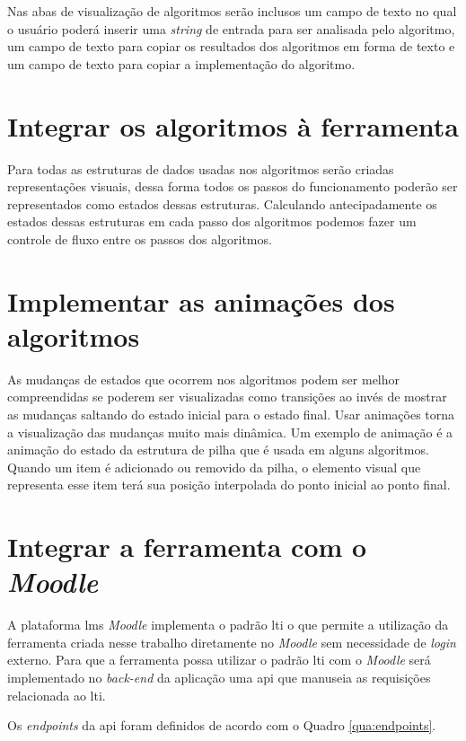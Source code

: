 Nas abas de visualização de algoritmos serão inclusos um campo de texto no qual o usuário poderá inserir uma \textit{string} de entrada para ser analisada pelo algoritmo, um campo de texto para copiar os resultados dos algoritmos em forma de texto e um campo de texto para copiar a implementação do algoritmo.

\section{Integrar os algoritmos à ferramenta}
Para todas as estruturas de dados usadas nos algoritmos serão criadas representações visuais, dessa forma todos os passos do funcionamento poderão ser representados como estados dessas estruturas. Calculando antecipadamente os estados dessas estruturas em cada passo dos algoritmos podemos fazer um controle de fluxo entre os passos dos algoritmos.

\section{Implementar as animações dos algoritmos}
As mudanças de estados que ocorrem nos algoritmos podem ser melhor compreendidas se poderem ser visualizadas como transições ao invés de mostrar as mudanças saltando do estado inicial para o estado final. Usar animações torna a visualização das mudanças muito mais dinâmica. Um exemplo de animação é a animação do estado da estrutura de pilha que é usada em alguns algoritmos. Quando um item é adicionado ou removido da pilha, o elemento visual que representa esse item terá sua posição interpolada do ponto inicial ao ponto final.

\section{Integrar a ferramenta com o \textit{Moodle}}
A plataforma \gls{lms} \textit{Moodle} implementa o padrão \gls{lti} o que permite a utilização da ferramenta criada nesse trabalho diretamente no \textit{Moodle} sem necessidade de \textit{login} externo. Para que a ferramenta possa utilizar o padrão \gls{lti} com o \textit{Moodle} será implementado no \textit{back-end} da aplicação uma \gls{api} que manuseia as requisições relacionada ao \gls{lti}.

Os \textit{endpoints} da \gls{api} foram definidos de acordo com o Quadro \ref{qua:endpoints}.

